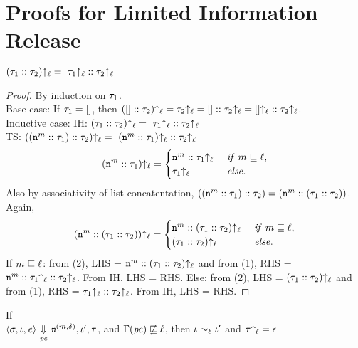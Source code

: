 \newpage
\section{Proofs for Limited Information Release}
\label{sec:app:lir}

\begin{myLemma}
\label{lem:app:lir:tp}
$(\tau_1::\tau_2){\uparrow_\ell} =~\tau_1{\uparrow_\ell}::\tau_2{\uparrow_\ell}$
\end{myLemma}
\begin{proof}
By induction on $\tau_1$.\\
Base case: If $\tau_1 = []$, then $([] :: \tau_2){\uparrow_\ell} =
\tau_2{\uparrow_\ell} = []::\tau_2{\uparrow_\ell} = []{\uparrow_\ell} :: \tau_2{\uparrow_\ell}$.\\
Inductive case: IH: $(\tau_1::\tau_2){\uparrow_\ell}
=~\tau_1{\uparrow_\ell}::\tau_2{\uparrow_\ell}$ \\
TS: $((\texttt{n}^m:: \tau_1)::\tau_2){\uparrow_\ell}
=~(\texttt{n}^m::\tau_1){\uparrow_\ell}::\tau_2{\uparrow_\ell}$\\
\begin{align}
(\texttt{n}^m::\tau_1){\uparrow_\ell} = 
  \begin{cases}
   \texttt{n}^m :: \tau_1{\uparrow_\ell}~ & \mathit{if }~ m \sqsubseteq \ell,\\
   \tau_1{\uparrow_\ell} & \mathit{else}.
  \end{cases}
\end{align}
Also by associativity of list concatentation, $((\texttt{n}^m::
\tau_1)::\tau_2) = (\texttt{n}^m:: (\tau_1::\tau_2))$. Again, 
\begin{align}
(\texttt{n}^m:: (\tau_1::\tau_2)){\uparrow_\ell} = 
  \begin{cases}
   \texttt{n}^m :: (\tau_1::\tau_2){\uparrow_\ell}~ & \mathit{if }~ m \sqsubseteq \ell,\\
   (\tau_1::\tau_2){\uparrow_\ell} & \mathit{else}.
  \end{cases}
\end{align}
If $m \sqsubseteq \ell$: 
from (2), LHS = $\texttt{n}^m :: (\tau_1::\tau_2){\uparrow_\ell}$ and from (1), RHS =
$\texttt{n}^m::\tau_1{\uparrow_\ell}::\tau_2{\uparrow_\ell}$. From IH, LHS = RHS.
Else: 
from (2), LHS = $(\tau_1::\tau_2){\uparrow_\ell}$ and from (1), RHS =
$\tau_1{\uparrow_\ell}::\tau_2{\uparrow_\ell}$. From IH, LHS = RHS.
\end{proof}

\begin{myLemma}
  \label{lem:app:lir:confe}
  If \\
  $\langle \sigma, \iota, \mathit{e} \rangle
  {~\underset{\mathit{pc}}{\Downarrow}~} \emph{\texttt{n}}^{(m, \delta)}, \iota', \tau$,
  and $\Gamma(\mathit{pc}) \not\sqsubseteq \ell$, then 
  $\iota \sim_\ell \iota'$ and $\tau{\uparrow_\ell} = \epsilon$
\end{myLemma}

